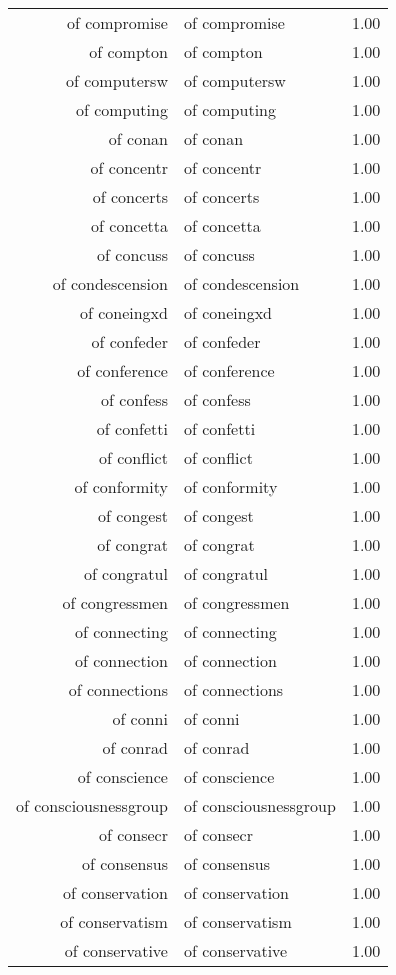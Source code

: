 \begin{table}[ht]
\begin{tabular}{rlr}
  of compromise & of compromise & 1.00 \\ 
  of compton & of compton & 1.00 \\ 
  of computersw & of computersw & 1.00 \\ 
  of computing & of computing & 1.00 \\ 
  of conan & of conan & 1.00 \\ 
  of concentr & of concentr & 1.00 \\ 
  of concerts & of concerts & 1.00 \\ 
  of concetta & of concetta & 1.00 \\ 
  of concuss & of concuss & 1.00 \\ 
  of condescension & of condescension & 1.00 \\ 
  of coneingxd & of coneingxd & 1.00 \\ 
  of confeder & of confeder & 1.00 \\ 
  of conference & of conference & 1.00 \\ 
  of confess & of confess & 1.00 \\ 
  of confetti & of confetti & 1.00 \\ 
  of conflict & of conflict & 1.00 \\ 
  of conformity & of conformity & 1.00 \\ 
  of congest & of congest & 1.00 \\ 
  of congrat & of congrat & 1.00 \\ 
  of congratul & of congratul & 1.00 \\ 
  of congressmen & of congressmen & 1.00 \\ 
  of connecting & of connecting & 1.00 \\ 
  of connection & of connection & 1.00 \\ 
  of connections & of connections & 1.00 \\ 
  of conni & of conni & 1.00 \\ 
  of conrad & of conrad & 1.00 \\ 
  of conscience & of conscience & 1.00 \\ 
  of consciousnessgroup & of consciousnessgroup & 1.00 \\ 
  of consecr & of consecr & 1.00 \\ 
  of consensus & of consensus & 1.00 \\ 
  of conservation & of conservation & 1.00 \\ 
  of conservatism & of conservatism & 1.00 \\ 
  of conservative & of conservative & 1.00 \\ 

\end{tabular}
\end{table}
